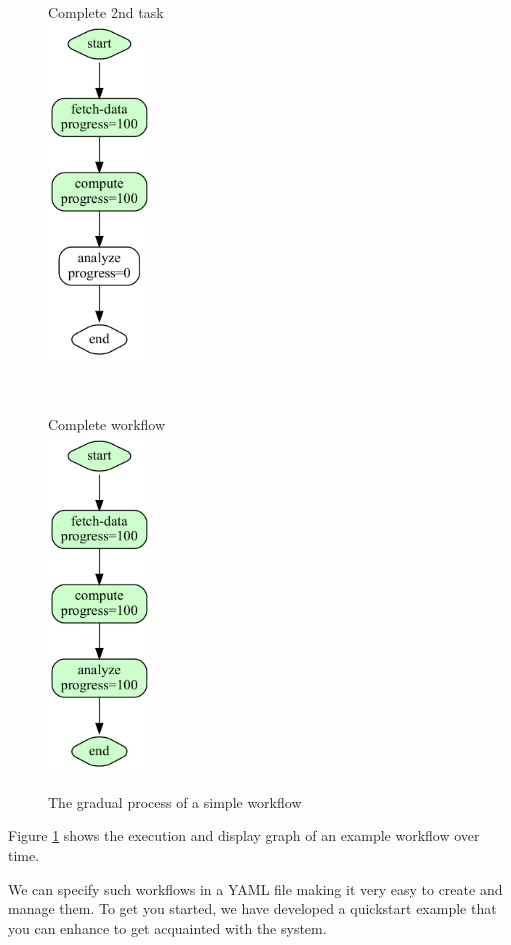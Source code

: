 \begin{figure}[htb]
{\begin{minipage}[b]{0.18\textwidth}
\end{minipage} \ \
\begin{minipage}[b]{0.18\textwidth}
Complete 2nd task \\
\includegraphics[height=9cm]{images/workflow-example-3.pdf}
\end{minipage} \ \
\begin{minipage}[b]{0.18\textwidth}
Complete workflow \\
\includegraphics[height=9cm]{images/workflow-example-5.pdf}
\end{minipage} 
}
\caption{The gradual process of a simple workflow}\label{fig:workflow-process}
\end{figure}


Figure \ref{fig:workflow-process} shows the execution and display graph of an example workflow
over time.

We can specify such workflows in a YAML file making it very easy to
create and manage them. To get you started, we have developed a
quickstart example that you can enhance to get acquainted with the
system.

